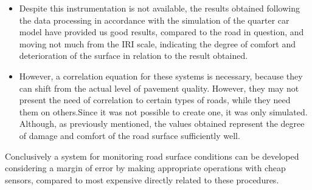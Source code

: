 \documentclass[tesi]{subfiles}
\begin{document}
\begin{description}
\begin{itemize}
\item Despite this instrumentation is not available, the results obtained following the data processing in accordance with the simulation of the quarter car model have provided us good results, compared to the road in question, and moving not much from the  IRI scale, indicating the degree of comfort and deterioration of the surface in relation to the result obtained.
\item However, a correlation equation for these systems is necessary, because they can shift from the actual level of pavement quality. However, they may not present the need of correlation to certain types of roads, while they need them on others.Since it was not possible to create one, it was only simulated. Although, as previously mentioned, the values obtained represent the degree of damage and comfort of the road surface sufficiently well.
\end{itemize}
\end{description}



\noindent  Conclusively a system for monitoring road surface conditions can be developed considering a margin of error by making appropriate operations with cheap sensors, compared to most expensive directly related to these procedures. 
\end{document}
